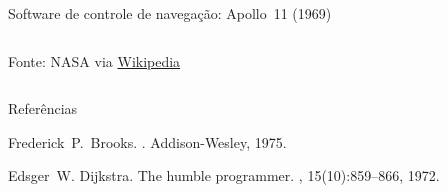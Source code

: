 \begin{frame}{Software de controle de navegação: Apollo~11 (1969)}
\begin{columns}
{\begin{column}{.5\textwidth}
      \vfill
      {\tiny Fonte: NASA via \href{https://en.wikipedia.org/wiki/File:Margaret_Hamilton.gif}{Wikipedia}}      
    \end{column}
}
  \end{columns}

\end{frame}

\begin{frame}{Referências}
  \begin{thebibliography}{1}

    Frederick~{P.}\ Brooks.
    .
    \newblock Addison-Wesley, 1975.
    
    Edsger~W. Dijkstra.
    \newblock The humble programmer.
    , 15(10):859--866, 1972.

  \end{thebibliography}

\end{frame}

